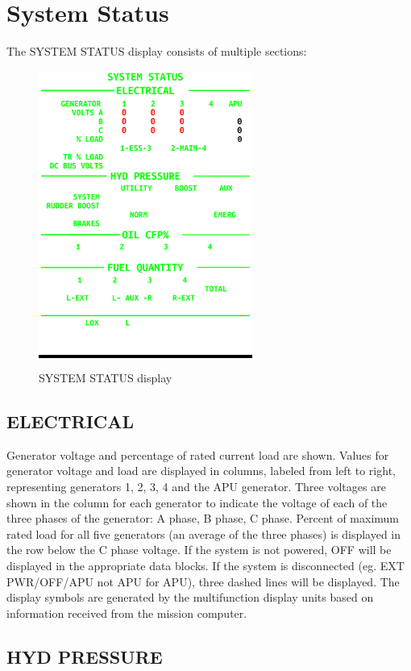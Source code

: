 \newpage
\section{System Status}

The SYSTEM STATUS display consists of multiple sections:

\begin{figure}[h]
  \centering
  \colorbox{black}{\includegraphics[width=7cm]{figures/hdd/SYSTEM-STATUS}}
  \caption{SYSTEM STATUS display}
\end{figure}

\subsection*{ELECTRICAL}
Generator voltage and percentage of rated current load are shown. Values for generator voltage and load are displayed in columns, labeled from left to right, representing generators 1, 2, 3, 4 and the APU generator. Three voltages are shown in the column for each generator to indicate the voltage of each of the three phases of the generator: A phase, B phase, C phase. Percent of maximum rated load for all five generators (an average of the three phases) is displayed in the row below the C phase voltage. If the system is not powered, OFF will be displayed in the appropriate data blocks. If the system is disconnected (eg. EXT PWR/OFF/APU not APU for APU), three dashed lines will be displayed. The display symbols are generated by the multifunction display units based on information received from the mission computer. 

\subsection*{HYD PRESSURE}

